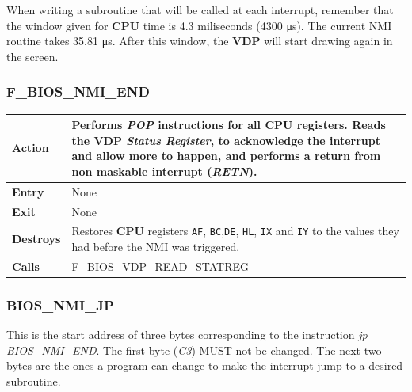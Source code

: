 \documentclass[a4paper,11pt]{article}
\begin{document}
    When writing a subroutine that will be called at each interrupt, remember
    that the window given for \textbf{CPU} time is 4.3 miliseconds (4300
    \si{\micro\second}). The current NMI routine takes 35.81 \si{\micro\second}.
    After this window, the \textbf{VDP} will start drawing again in the screen.

    \subsubsection{F\_BIOS\_NMI\_END}
    \label{func:fbiosnmiend}
    \begin{tabular}{l p{9cm}}
        \hline\textbf{Action}
        & Performs \textit{POP} instructions for all \textbf{CPU} registers.
        Reads the \textbf{VDP} \textit{Status Register}, to acknowledge the
        interrupt and allow more to happen, and  performs a return from non
        maskable interrupt (\textit{RETN}).\\
        \hline\textbf{Entry} & None\\
        \hline\textbf{Exit} & None\\
        \hline\textbf{Destroys} & Restores \textbf{CPU} registers \texttt{AF},
        \texttt{BC},\texttt{DE}, \texttt{HL}, \texttt{IX} and \texttt{IY} to the
        values they had before the NMI was triggered.\\
        \hline\textbf{Calls} & \hyperref[func:fbiosvdpreadstatreg]
        {F\_BIOS\_VDP\_READ\_STATREG}\\
        \hline
    \end{tabular}

    \subsubsection{BIOS\_NMI\_JP}
    \label{func:fbiosnmijp}

    This is the start address of three bytes corresponding to the instruction
    \textit{jp BIOS\_NMI\_END}. The first byte (\textit{C3}) MUST not be changed.
    The next two bytes are the ones a program can change to make the interrupt
    jump to a desired subroutine.

\end{document}
